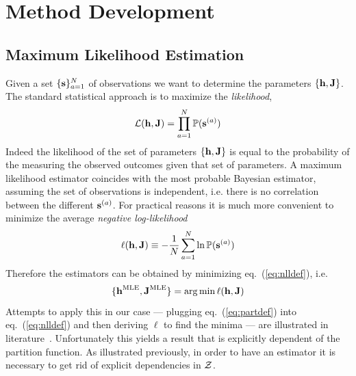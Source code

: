 \documentclass[a4paper,12pt,twoside]{article}
\def \eq#1{eq.~(\ref{#1})}
\def \be {\begin{equation}}
\def \ee {\end{equation}}
\def \bf {\textbf}
\def \part {{\cal Z}}
\def \P {{\mathbb{P}}}
\begin{document}
\section{Method Development}
\subsection{Maximum Likelihood Estimation}
Given a set $\{\bf s\}_{a=1}^N$ of  observations we want to determine the parameters $\{\bf  h,\bf J\}$.
The standard statistical approach is to maximize the {\em likelihood},
\be
  {\cal L}(\bf h,\bf J) = \prod_{a=1}^N \P(\bf s^{(a)})
  \label{eq:likedef}
\ee
Indeed the likelihood of the set of parameters  $\{\bf  h,\bf J\}$ is equal to the probability of the measuring the observed outcomes given that set of parameters.
A maximum likelihood estimator coincides with the most probable Bayesian estimator, assuming the set of observations is independent, i.e. there is no correlation between the different $\bf s^{(a)}$.
For practical reasons it is much more convenient to minimize the average {\em negative log-likelihood}~\cite{eke2012}
\be
  \ell(\bf h,\bf J) \equiv -\frac{1}{N}\sum_{a=1}^N \ln \P(\bf s^{(a)})
  \label{eq:nlldef}
\ee
Therefore the estimators can be obtained by minimizing \eq{eq:nlldef}, i.e.
\be
  \{\bf h^{\rm MLE}, \bf J^{\rm MLE}\} = \arg\min \ell(\bf h,\bf J)
\ee
Attempts to apply this in our case --- plugging \eq{eq:partdef} into \eq{eq:nlldef} and then deriving $\ell$ to find the minima --- are illustrated in literature~\cite{eke2012}.
Unfortunately this yields a result that  is explicitly dependent of the partition function.
As illustrated previously, in order to have an estimator it is necessary to get rid of explicit dependencies in $\part$.
\end{document}
